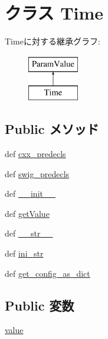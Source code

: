 \hypertarget{classm5_1_1params_1_1Time}{
\section{クラス Time}
\label{classm5_1_1params_1_1Time}
}
Timeに対する継承グラフ:\begin{figure}[H]
\begin{center}
\leavevmode
\includegraphics[height=2cm]{classm5_1_1params_1_1Time}
\end{center}
\end{figure}
\subsection*{Public メソッド}
\begin{DoxyCompactItemize}
\item 
def \hyperlink{classm5_1_1params_1_1Time_a0b408a11a14bd1d770e28f71a6e14ab5}{cxx\_\-predecls}
\item 
def \hyperlink{classm5_1_1params_1_1Time_ab3dbcf5716623eac67a8ccc074fa7e13}{swig\_\-predecls}
\item 
def \hyperlink{classm5_1_1params_1_1Time_ac775ee34451fdfa742b318538164070e}{\_\-\_\-init\_\-\_\-}
\item 
def \hyperlink{classm5_1_1params_1_1Time_acc340fbd4335fa34f9d57fb454b28ed0}{getValue}
\item 
def \hyperlink{classm5_1_1params_1_1Time_aa7a4b9bc0941308e362738503137460e}{\_\-\_\-str\_\-\_\-}
\item 
def \hyperlink{classm5_1_1params_1_1Time_a33ebe6cd32bcbd15465fc28b9d94bf82}{ini\_\-str}
\item 
def \hyperlink{classm5_1_1params_1_1Time_ab1772c0da7b9e12819e1c0373513c53c}{get\_\-config\_\-as\_\-dict}
\end{DoxyCompactItemize}
\subsection*{Public 変数}
\begin{DoxyCompactItemize}
\item 
\hyperlink{classm5_1_1params_1_1Time_afcc7a4b78ecd8fa7e713f8cfa0f51017}{value}
\end{DoxyCompactItemize}
